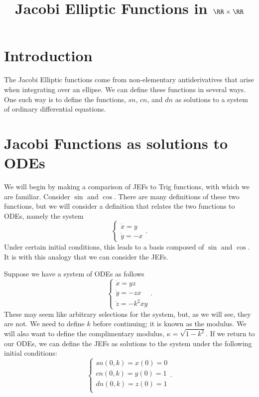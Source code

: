 \documentclass[notitlepage]{hw}
\title{Jacobi Elliptic Functions in $\RR\times\RR$}
\date{}
\author{}
\begin{document}
\maketitle

\section{Introduction}

The Jacobi Elliptic functions come from non-elementary antiderivatives that arise when integrating
over an ellipse. We can define these functions in several ways. One such way is to define the
functions, $sn$, $cn$, and $dn$ as solutions to a system of ordinary differential equations.

\section{Jacobi Functions as solutions to ODEs}

We will begin by making a comparison of JEFs to Trig functions, with which we are familiar. Consider
$\sin{}$ and $\cos{}$. There are many definitions of these two functions, but we will consider a
definition that relates the two functions to ODEs, namely the system
\[
\begin{cases}
\dot{x}=y\\
\dot{y}=-x
\end{cases}.
\]
Under certain initial conditions, this leads to a basis composed of $\sin{}$ and $\cos{}$. It is with
this analogy that we can consider the JEFs.

Suppose we have a system of ODEs as follows
\[
\begin{cases}
\dot{x}=yz\\
\dot{y}=-zx\\
\dot{z}=-k^{2}xy
\end{cases}.
\]
These may seem like arbitrary selections for the system, but, as we will see, they are not. We need
to define $k$ before continuing; it is known as the modulus. We will also want to define the
complimentary modulus, $\kappa=\sqrt{1-k^{2}}$. If we return to our ODEs, we can define the JEFs
as solutions to the system under the following initial conditions:
\[
\begin{cases}
sn(0,k)=x(0)=0\\
cn(0,k)=y(0)=1\\
dn(0,k)=z(0)=1\\
\end{cases}.
\]
\end{document}
